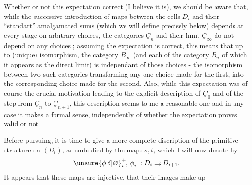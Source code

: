 Whether or not this expectation  correct (I believe it is\handwritten{$^{*}$}), we should
be aware that, while the successive introduction of maps between the cells $D_i$ and their ``standart'' amalgamated sums (which we will define precisely below) depends at every stage on arbitrary choices, the categories $\underline{C}_n$ and their limit $\underline{C}_\infty$ do not depend on any  choices ; assuming the expectation is correct, this means that up to (unique) isomorphism, the category $B_\infty$ (and each of the category $B_n$ of which it appears as the direct limit) is independant of those choices - the isomorphism between two such categories transforming any one choice made for the first, into the corresponding choice made for the second. Also, while this expectation was of course the crucial motivation leading to the explicit description of $\underline{C}_0$ and of the  step from $\underline{C}_n$ to $\underline{C}_{n+1}$, this description seems to me a reasonable one and in any case it makes a formal sense,  independently of whether the expectation proves valid or not

 Before pursuing, it is time to give a more complete discription of the primitive structure on $(D_i)$, as embodied by the maps $s,t$, which I will now denote by
\[
{\unsure{\phi|\delta|\varnothing}}_i^+,\,\phi_i^-:D_i\rightrightarrows D_{i+1}.
\]
It appears that these maps are injective, that their images make up
